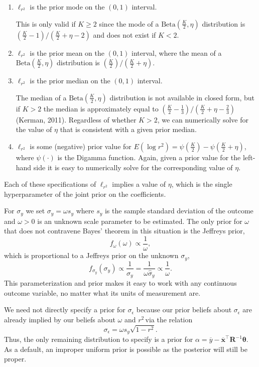 \documentclass[11pt]{article}
\newcommand{\Rsq}{$r^2\,$}
\newcommand{\boldtheta}{\boldsymbol{\theta}}
\newcommand{\sigmaEps}{\sigma_{\epsilon}}
\newcommand{\R}{\mathbf{R}}
\newcommand{\locRsq}{\ell_{r^2}}
\newcommand{\halfK}{\frac{K}{2}}
\newcommand{\Betadist}[2]{\mathrm{Beta}\left(#1,#2\right)}
\newcommand{\Digamma}[1]{\psi\left(#1\right)}
\begin{document}
\begin{enumerate}
\item $\locRsq$ is the prior mode on the $\left(0,1\right)$ interval.

This is only valid if $K \geq 2$ since the mode of a $\Betadist{\halfK}{\eta}$
distribution is \newline
$\left(\halfK - 1\right) / \left(\halfK + \eta - 2\right)$
and does not exist if $K < 2$.

\item $\locRsq$ is the prior mean on the $\left(0,1\right)$ interval, where
the mean of a $\Betadist{\halfK}{\eta}$ distribution is
$\left(\halfK\right) / \left(\halfK + \eta\right)$.

\item $\locRsq$ is the prior median on the $\left(0,1\right)$ interval.

The median of a $\Betadist{\halfK}{\eta}$ distribution is not available in
closed form, but if $K > 2$ the median is approximately equal to
$\left(\halfK - \frac{1}{3}\right) / \left(\halfK + \eta - \frac{2}{3}\right)$
(Kerman, 2011). Regardless of whether $K > 2$, we can numerically solve for the
value of $\eta$ that is consistent with a given prior median.

\item $\locRsq$ is some (negative) prior value for
$E\left(\log{r^2}\right) = \Digamma{\halfK} - \Digamma{\halfK + \eta}$,
where $\Digamma{\cdot}$ is the Digamma function. Again, given a prior value for
the left-hand side it is easy to numerically solve for the corresponding value
of $\eta$.
\end{enumerate}
%
Each of these specifications of $\locRsq$ implies a value of $\eta$,
which is the single hyperparameter of the joint prior on the coefficients.

For $\sigma_y$ we set $\sigma_y = \omega s_y$ where $s_y$ is the sample standard
deviation of the outcome and $\omega > 0$ is an unknown scale parameter to be
estimated. The only prior for $\omega$ that does not contravene Bayes' theorem
in this situation is the Jeffreys prior,
$$f_\omega \left(\omega\right) \propto \frac{1}{\omega},$$
which is proportional to a Jeffreys prior on the unknown $\sigma_y$,
$$f_{\sigma_y} \left(\sigma_y\right) \propto \frac{1}{\sigma_y}
= \frac{1}{\omega \widehat{\sigma}_y} \propto \frac{1}{\omega}.$$
This parameterization and prior makes it easy to work with any continuous
outcome variable, no matter what its units of measurement are.

We need not directly specify a prior for $\sigmaEps$ because our prior beliefs
about $\sigmaEps$ are already implied by our beliefs about $\omega$ and \Rsq via
the relation
$$\sigmaEps = \omega s_y \sqrt{1 - r^2}.$$
Thus, the only remaining distribution to specify is a prior for
$\alpha = \overline{y} - \overline{\mathbf{x}}^\top \R^{-1} \boldtheta$.
As a default, an improper uniform prior is possible as the posterior will still
be proper.
\end{document}
